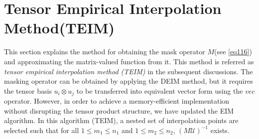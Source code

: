 \documentclass{article}
\begin{document}
\section{Tensor Empirical Interpolation Method(TEIM)}
\label{section:sec2}
This section explains the method for obtaining the mask operator $M$(see \eqref{eq116}) and approximating the matrix-valued function from it. This method is referred as \emph{tensor empirical interpolation method (TEIM)} in the subsequent discussions. The masking operator can be obtained by applying the DEIM method, but it requires the tensor basis $u_i \otimes u_j$ to be transferred into equivalent vector form using the $vec$ operator. However, in order to achieve a memory-efficient implementation without disrupting the tensor product structure, we have updated the EIM algorithm. In this algorithm (TEIM), a nested set of interpolation points are selected such that for all $1 \leq m_1 \leq n_1$ and $1 \leq m_2 \leq n_2$, $(M\mathcal{U})^{-1}$ exists.
\end{document}
